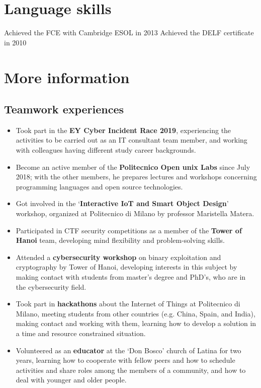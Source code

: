 \section{Language skills}
    {Achieved the FCE with Cambridge ESOL in 2013}
    {Achieved the DELF certificate in 2010}
    {}

\pagebreak

\section{More information}
    \vspace{-0.1cm}
    \sethintscolumnlength{2cm}
    \subsection{Teamwork experiences}
    \begin{itemize}
        \item Took part in the \textbf{EY Cyber Incident Race 2019}, experiencing the activities to be carried out as an IT consultant team member, and working with colleagues having different study career backgrounds.
        \item Become an active member of the \textbf{Politecnico Open unix Labs} since July 2018; with the other members, he prepares lectures and workshops concerning programming languages and open source technologies.
        \item Got involved in the ‘\textbf{Interactive IoT and Smart Object Design}’ workshop, organized at Politecnico di Milano by professor Maristella Matera.
        \item Participated in CTF security competitions as a member of the \textbf{Tower of Hanoi} team, developing mind flexibility and problem-solving skills.
        \item Attended a \textbf{cybersecurity workshop} on binary exploitation and cryptography by Tower of Hanoi, developing interests in this subject by making contact with students from master's degree and PhD's, who are in the cybersecurity field.
        \item Took part in \textbf{hackathons} about the Internet of Things at Politecnico di Milano, meeting students from other countries (e.g. China, Spain, and India), making contact and working with them, learning how to develop a solution in a time and resource constrained situation.
        \item Volunteered as an \textbf{educator} at the ‘Don Bosco’ church of Latina for two years, learning how to cooperate with fellow peers and how to schedule activities and share roles among the members of a community, and how to deal with younger and older people.
    \end{itemize}

